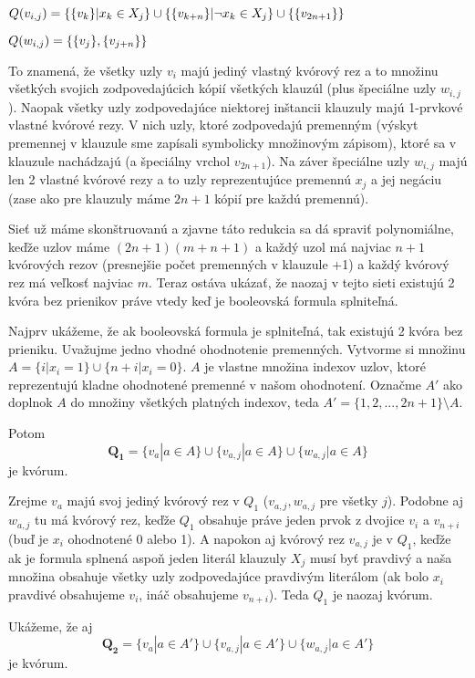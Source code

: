 $\hfill Q(v_{i,j})=\{\{v_k\} | x_k\in X_j\}\cup \{\{v_{k+n}\} | \neg x_k\in X_j\}\cup \{\{v_{2n+1}\}\}\hfill$

$\hfill Q(w_{i,j})=\{\{v_j\}, \{v_{j+n}\}\} \hfill$

\vspace{5mm}
To znamená, že všetky uzly $v_i$ majú jediný vlastný kvórový rez a to množinu
všetkých svojich zodpovedajúcich kópií všetkých klauzúl (plus špeciálne uzly
$w_{i,j}$).
Naopak všetky uzly zodpovedajúce niektorej inštancii klauzuly majú 1-prvkové
vlastné kvórové rezy. V nich uzly, ktoré zodpovedajú premenným
(výskyt premennej v klauzule sme zapísali symbolicky množinovým zápisom),
ktoré sa v klauzule nachádzajú (a špeciálny vrchol $v_{2n+1}$).
Na záver špeciálne uzly $w_{i,j}$ majú len 2 vlastné kvórové rezy a to uzly
reprezentujúce premennú $x_j$ a jej negáciu (zase ako pre klauzuly máme $2n+1$ kópií
pre každú premennú).

Sieť už máme skonštruovanú a zjavne táto redukcia sa dá spraviť polynomiálne,
keďže uzlov máme $(2n+1)(m+n+1)$ a každý uzol má najviac $n+1$ kvórových rezov
(presnejšie počet premenných v klauzule +1) a každý kvórový rez má veľkosť
najviac $m$. Teraz ostáva ukázať, že naozaj v tejto sieti existujú 2 kvóra bez
prienikov práve vtedy keď je booleovská formula splniteľná.

Najprv ukážeme, že ak booleovská formula je splniteľná, tak existujú 2 kvóra
bez prieniku.
Uvažujme jedno vhodné ohodnotenie premenných. Vytvorme si množinu\\
$A=\{i | x_i=1\}\cup \{n+i | x_i=0\}$. $A$ je vlastne množina indexov uzlov,
ktoré reprezentujú kladne ohodnotené premenné v našom ohodnotení.
Označme $A'$ ako doplnok $A$ do množiny všetkých platných indexov, teda
$A'=\{1,2,..., 2n+1\} \setminus A$.

Potom
$$\mathbf{Q_1}=\{v_a | a\in A\}\cup \{v_{a,j} | a\in A\}\cup \{w_{a,j} | a\in A\}$$
je kvórum.

Zrejme $v_a$ majú svoj jediný kvórový rez v $Q_1$ ($v_{a,j}, w_{a,j}$ pre všetky $j$).
Podobne aj $w_{a,j}$ tu má kvórový rez, keďže $Q_1$ obsahuje práve jeden
prvok z dvojice $v_i$ a $v_{n+i}$ (buď je $x_i$ ohodnotené 0 alebo 1).
A napokon aj kvórový rez $v_{a,j}$ je v $Q_1$, keďže
ak je formula splnená aspoň jeden literál klauzuly $X_j$ musí byť pravdivý a
naša množina obsahuje všetky uzly zodpovedajúce pravdivým literálom (ak bolo
$x_i$ pravdivé obsahujeme $v_i$, ináč obsahujeme $v_{n+i}$).
Teda $Q_1$ je naozaj kvórum.

Ukážeme, že aj
$$\mathbf{Q_2}=\{v_a | a\in A'\}\cup \{v_{a,j} | a\in A'\}\cup \{w_{a,j} | a\in A'\}$$
je kvórum.


